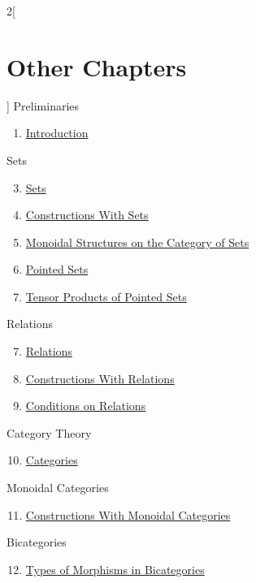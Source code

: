 \begin{multicols}{2}[\section{Other Chapters}]
\noindent
Preliminaries
\begin{enumerate}
\item \hyperref[introduction:section-phantom]{Introduction}
\end{enumerate}
Sets
\begin{enumerate}
\setcounter{enumi}{2}
\item \hyperref[sets:section-phantom]{Sets}
\item \hyperref[constructions-with-sets:section-phantom]{Constructions With Sets}
\item \hyperref[monoidal-structures-on-the-category-of-sets:section-phantom]{Monoidal Structures on the Category of Sets}
\item \hyperref[pointed-sets:section-phantom]{Pointed Sets}
\item \hyperref[tensor-products-of-pointed-sets:section-phantom]{Tensor Products of Pointed Sets}
\end{enumerate}
Relations
\begin{enumerate}
\setcounter{enumi}{6}
\item \hyperref[relations:section-phantom]{Relations}
\item \hyperref[constructions-with-relations:section-phantom]{Constructions With Relations}
\item \hyperref[conditions-on-relations:section-phantom]{Conditions on Relations}
\end{enumerate}
Category Theory
\begin{enumerate}
\setcounter{enumi}{9}
\item \hyperref[categories:section-phantom]{Categories}
\end{enumerate}
Monoidal Categories
\begin{enumerate}
\setcounter{enumi}{10}
\item \hyperref[constructions-with-monoidal-categories:section-phantom]{Constructions With Monoidal Categories}
\end{enumerate}
Bicategories
\begin{enumerate}
\setcounter{enumi}{11}
\item \hyperref[types-of-morphisms-in-bicategories:section-phantom]{Types of Morphisms in Bicategories}
\end{enumerate}
\end{multicols}
